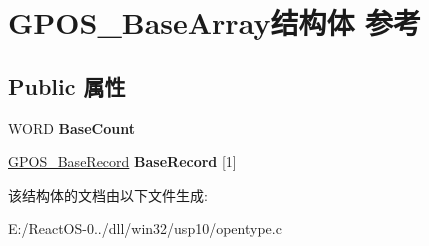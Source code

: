 \hypertarget{struct_g_p_o_s___base_array}{}\section{G\+P\+O\+S\+\_\+\+Base\+Array结构体 参考}
\label{struct_g_p_o_s___base_array}
\subsection*{Public 属性}
\begin{DoxyCompactItemize}
\item 
\mbox{\label{struct_g_p_o_s___base_array_a5a4106306b3c5c8ab941ca7683cb83c3}} 
W\+O\+RD {\bfseries Base\+Count}
\item 
\mbox{\label{struct_g_p_o_s___base_array_a58ba8bcd909cbd1cfbabbce4050e5d5c}} 
\hyperlink{struct_g_p_o_s___base_record}{G\+P\+O\+S\+\_\+\+Base\+Record} {\bfseries Base\+Record} \mbox{[}1\mbox{]}
\end{DoxyCompactItemize}


该结构体的文档由以下文件生成\+:\begin{DoxyCompactItemize}
\item 
E\+:/\+React\+O\+S-\/0../dll/win32/usp10/opentype.\+c\end{DoxyCompactItemize}
